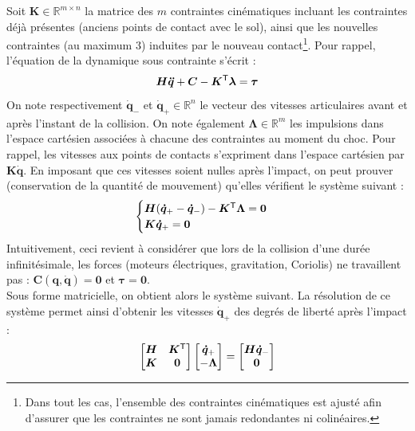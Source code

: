 Soit $\bm{K} \in \mathbb{R}^{m \times n}$ la matrice des $m$ contraintes
cinématiques incluant les contraintes déjà présentes (anciens points de contact avec le sol),
ainsi que les nouvelles contraintes (au maximum $3$) induites par le nouveau
contact\footnote{Dans tout les cas, l'ensemble des contraintes cinématiques
est ajusté afin d'assurer que les contraintes ne sont jamais redondantes
ni colinéaires.}.
Pour rappel, l'équation de la dynamique sous contrainte s'écrit :
$$
\bm{H}\bm{\ddot{q}} + \bm{C} - \bm{K}^{\mathsf{T}}\bm{\lambda} = \bm{\tau}
$$
On note respectivement $\bm{\dot{q}}_{-}$ et $\bm{\dot{q}}_{+} \in \mathbb{R}^{n}$
le vecteur des vitesses articulaires avant et après l'instant de la collision.
On note également $\bm{\Lambda} \in \mathbb{R}^{m}$ les impulsions dans l'espace 
cartésien associées à chacune des contraintes au moment du choc.
Pour rappel, les vitesses aux points de contacts s'expriment dans l'espace cartésien
par $\bm{K}\bm{\dot{q}}$. En imposant que ces vitesses soient nulles après l'impact, 
on peut prouver (conservation de la quantité de mouvement)
qu'elles vérifient le système suivant :
$$
\begin{cases}
    \bm{H}(\bm{\dot{q}}_{+}-\bm{\dot{q}}_{-}) - \bm{K}^{\mathsf{T}}\bm{\Lambda} = \bm{0} \\
\bm{K}\bm{\dot{q}}_{+} = \bm{0} \\
\end{cases}
$$
Intuitivement, ceci revient à considérer que lors de la collision d'une durée infinitésimale,
les forces (moteurs électriques, gravitation, Coriolis) ne travaillent pas : 
$\bm{C}(\bm{q}, \bm{\dot{q}}) = \bm{0}$ et $\bm{\tau} = \bm{0}$.\\

Sous forme matricielle, on obtient alors le système suivant.
La résolution de ce système permet ainsi d'obtenir 
les vitesses $\bm{\dot{q}}_{+}$ des degrés de liberté après l'impact :
$$
\begin{bmatrix}
    \bm{H} & \bm{K}^{\mathsf{T}} \\
    \bm{K} & \bm{0} \\
\end{bmatrix}
\begin{bmatrix}
    \bm{\dot{q}}_{+} \\
    -\bm{\Lambda} \\
\end{bmatrix}
=
\begin{bmatrix}
    \bm{H}\bm{\dot{q}}_{-} \\
    \bm{0} \\
\end{bmatrix}
$$

